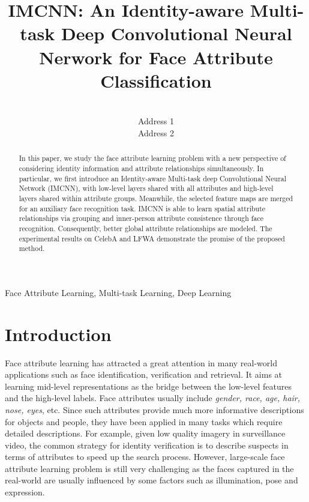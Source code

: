 \documentclass[wcp]{jmlr}
\title[Short Title]{IMCNN: An Identity-aware Multi-task Deep Convolutional Neural Nerwork for Face Attribute Classification}
\author{\Name{Author Name1} \Email{abc@sample.com}\\
	\addr Address 1
	\AND
	\Name{Author Name2} \Email{xyz@sample.com}\\
	\addr Address 2
}
\begin{document}
\newcommand{\tabincell}[2]{\begin{tabular}{@{}#1@{}}#2\end{tabular}}
	
	\maketitle
	
	\begin{abstract}
		In this paper, we study the face attribute learning problem with a new perspective of considering identity information and attribute relationships simultaneously. In particular, we first introduce an Identity-aware Multi-task deep Convolutional Neural Network (IMCNN), with low-level layers shared with all attributes and high-level layers shared within attribute groups. Meanwhile, the selected feature maps are merged for an auxiliary face recognition task. IMCNN is able to learn spatial attribute relationships via grouping and inner-person attribute consistence through face recognition. Consequently, better global attribute relationships are modeled. The experimental results on CelebA and LFWA demonstrate the promise of the proposed method.
	\end{abstract}
	\begin{keywords}
		Face Attribute Learning, Multi-task Learning, Deep Learning
	\end{keywords}
	
	\section{Introduction}
	
	Face attribute learning has attracted a great attention in many real-world applications such as face identification, verification and retrieval. It aims at learning mid-level representations as the bridge between the low-level features and the high-level labels. Face attributes usually include {\em gender, race, age, hair, nose, eyes}, etc. Since such attributes provide much more informative descriptions for objects and people, they have been applied in many tasks which require detailed descriptions. For example, given low quality imagery in surveillance video, the common strategy for identity verification is to describe suspects in terms of attributes to speed up the search process. However, large-scale face attribute learning problem is still very challenging as the faces captured in the real-world are usually influenced by some factors such as illumination, pose and expression.
	
\end{document}
